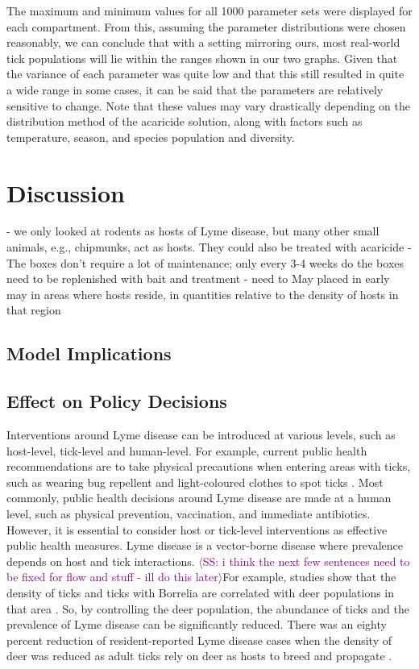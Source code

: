 \documentclass[12pt, centerh1]{article}
\newcommand{\sophie}[1]{{\textcolor{purple}{$\langle$SS: #1$\rangle$}}}
\begin{document}
The maximum and minimum values for all 1000 parameter sets were displayed for each compartment. From this, assuming the parameter distributions were chosen reasonably, we can conclude that with a setting mirroring ours, most real-world tick populations will lie within the ranges shown in our two graphs. Given that the variance of each parameter was quite low and that this still resulted in quite a wide range in some cases, it can be said that the parameters are relatively sensitive to change. Note that these values may vary drastically depending on the distribution method of the acaricide solution, along with factors such as temperature, season, and species population and diversity.

\section{Discussion}

- we only looked at rodents as hosts of Lyme disease, but many other small animals, e.g., chipmunks, act as hosts. They could also be treated with acaricide 
- The boxes don't require a lot of maintenance; only every 3-4 weeks do the boxes need to be replenished with bait and treatment
- need to May placed in early may in areas where hosts reside, in quantities relative to the density of hosts in that region


\subsection{Model Implications}



\subsection{Effect on Policy Decisions}
Interventions around Lyme disease can be introduced at various levels, such as host-level, tick-level and human-level. For example, current public health recommendations are to take physical precautions when entering areas with ticks, such as wearing bug repellent and light-coloured clothes to spot ticks \citep{govcan}. Most commonly, public health decisions around Lyme disease are made at a human level, such as physical prevention, vaccination, and immediate antibiotics. However, it is essential to consider host or tick-level interventions as effective public health measures. Lyme disease is a vector-borne disease where prevalence depends on host and tick interactions. \sophie{i think the next few sentences need to be fixed for flow and stuff - ill do this later}For example, studies show that the density of ticks and ticks with Borrelia are correlated with deer populations in that area \citep{kilpatrick2014relationship}. So, by controlling the deer population, the abundance of ticks and the prevalence of Lyme disease can be significantly reduced. There was an eighty percent reduction of resident-reported Lyme disease cases when the density of deer was reduced as adult ticks rely on deer as hosts to breed and propagate \citep{kilpatrick2014relationship}.  
\end{document}
